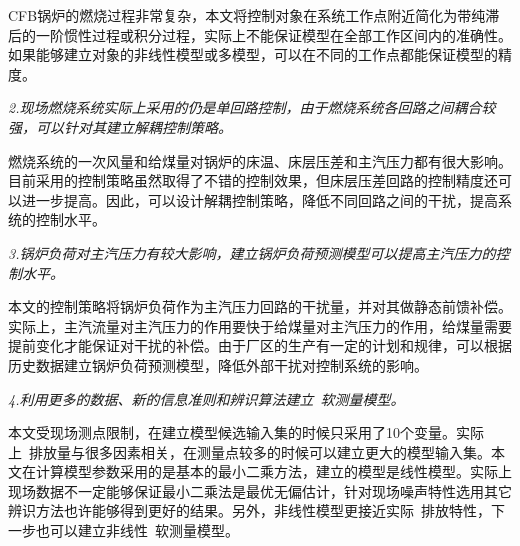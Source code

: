 CFB锅炉的燃烧过程非常复杂，本文将控制对象在系统工作点附近简化为带纯滞后的一阶惯性过程或积分过程，实际上不能保证模型在全部工作区间内的准确性。如果能够建立对象的非线性模型或多模型，可以在不同的工作点都能保证模型的精度。

\emph{2.现场燃烧系统实际上采用的仍是单回路控制，由于燃烧系统各回路之间耦合较强，可以针对其建立解耦控制策略。}

燃烧系统的一次风量和给煤量对锅炉的床温、床层压差和主汽压力都有很大影响。目前采用的控制策略虽然取得了不错的控制效果，但床层压差回路的控制精度还可以进一步提高。因此，可以设计解耦控制策略，降低不同回路之间的干扰，提高系统的控制水平。

\emph{3.锅炉负荷对主汽压力有较大影响，建立锅炉负荷预测模型可以提高主汽压力的控制水平。}

本文的控制策略将锅炉负荷作为主汽压力回路的干扰量，并对其做静态前馈补偿。实际上，主汽流量对主汽压力的作用要快于给煤量对主汽压力的作用，给煤量需要提前变化才能保证对干扰的补偿。由于厂区的生产有一定的计划和规律，可以根据历史数据建立锅炉负荷预测模型，降低外部干扰对控制系统的影响。

\emph{4.利用更多的数据、新的信息准则和辨识算法建立~软测量模型。}

本文受现场测点限制，在建立模型候选输入集的时候只采用了10个变量。实际上~排放量与很多因素相关，在测量点较多的时候可以建立更大的模型输入集。本文在计算模型参数采用的是基本的最小二乘方法，建立的模型是线性模型。实际上现场数据不一定能够保证最小二乘法是最优无偏估计，针对现场噪声特性选用其它辨识方法也许能够得到更好的结果。另外，非线性模型更接近实际~排放特性，下一步也可以建立非线性~软测量模型。

